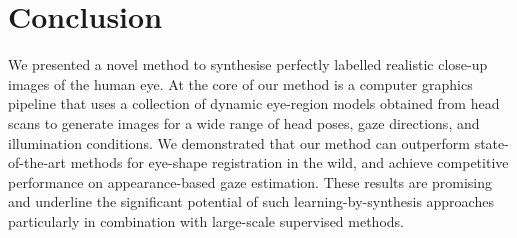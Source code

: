 
\section{Conclusion}


We presented a novel method to synthesise perfectly labelled realistic close-up images of the human eye.
At the core of our method is a computer graphics pipeline that uses a collection of dynamic eye-region models obtained from head scans to generate images for a wide range of head poses, gaze directions, and illumination conditions.
We demonstrated that our method can outperform state-of-the-art methods for eye-shape registration in the wild, and achieve competitive performance on appearance-based gaze estimation.
These results are promising and underline the significant potential of such learning-by-synthesis approaches particularly in combination with large-scale supervised methods.